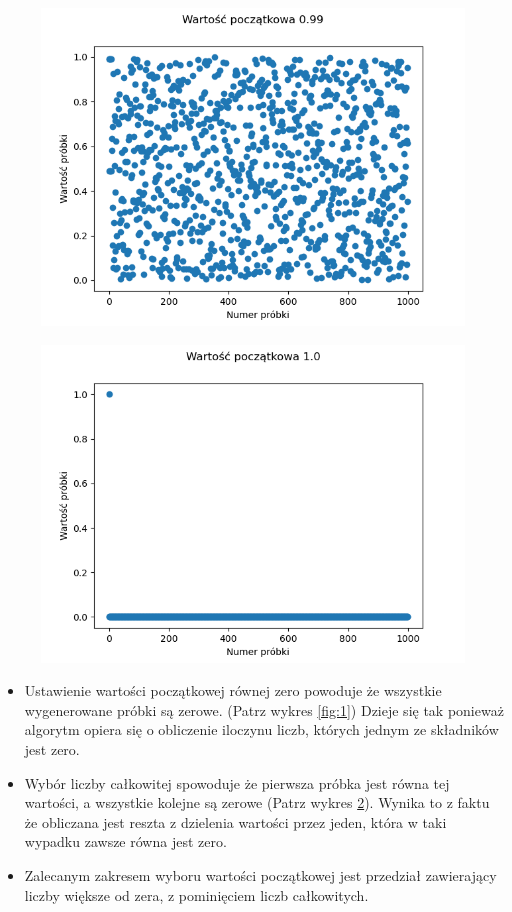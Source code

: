 \documentclass[12pt,a4paper]{article}
\begin{document}
  \begin{figure}[H]
    \centering
    \includegraphics[height=0.3\textheight]{figures/Figure_4.png}
    \label{fig:4}
  \end{figure}

  \begin{figure}[H]
    \centering
    \includegraphics[height=0.3\textheight]{figures/Figure_5.png}
    \label{fig:5}
  \end{figure}
  
  \begin{itemize}
    \item Ustawienie wartości początkowej równej zero powoduje że wszystkie wygenerowane próbki są zerowe. (Patrz wykres \ref{fig:1}) Dzieje się tak ponieważ algorytm opiera się o obliczenie iloczynu liczb, których jednym ze składników jest zero.
    \item Wybór liczby całkowitej spowoduje że pierwsza próbka jest równa tej wartości, a wszystkie kolejne są zerowe (Patrz wykres \ref{fig:5}). Wynika to z faktu że obliczana jest reszta z dzielenia wartości przez jeden, która w taki wypadku zawsze równa jest zero.
    \item Zalecanym zakresem wyboru wartości początkowej jest przedział zawierający liczby większe od zera, z pominięciem liczb całkowitych.
  \end{itemize}
\end{document}

